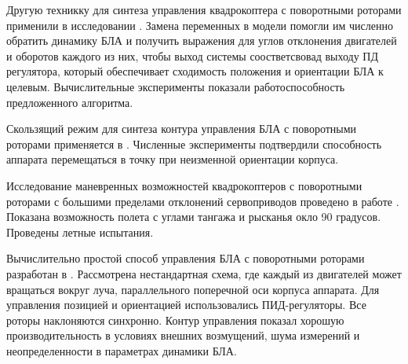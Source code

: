 Другую техникку для синтеза управления квадрокоптера с поворотными роторами применили в исследовании \cite{Falconi01}.
Замена переменных в модели помогли им численно обратить динамику БЛА и получить выражения для углов отклонения двигателей и оборотов каждого из них, чтобы выход системы соостветсвовад выходу ПД регулятора, который обеспечивает сходимость положения и ориентации БЛА к целевым.
Вычислительные эксперименты показали работоспособность предложенного алгоритма.

Скользящий режим для синтеза контура управления БЛА с поворотными роторами применяется в \cite{Yih01}. 
Численные эксперименты подтвердили способность аппарата перемещаться в точку при неизменной ориентации корпуса.

Исследование маневренных возможностей квадрокоптеров с поворотными роторами с большими пределами отклонений сервоприводов проведено в работе \cite{Oosedo01}.
Показана возможность полета с углами тангажа и рысканья окло 90 градусов.
Проведены летные испытания.

Вычислительно простой способ управления БЛА с поворотными роторами разработан в \cite{Alkamachi01}. Рассмотрена нестандартная схема, где каждый из двигателей может вращаться вокруг луча,
параллельного поперечной оси корпуса аппарата.
Для управления позицией и ориентацией использовались ПИД-регуляторы.
Все роторы наклоняются синхронно.
Контур управления показал хорошую производительность в условиях внешних возмущений, шума измерений и неопределенности в параметрах динамики БЛА.

